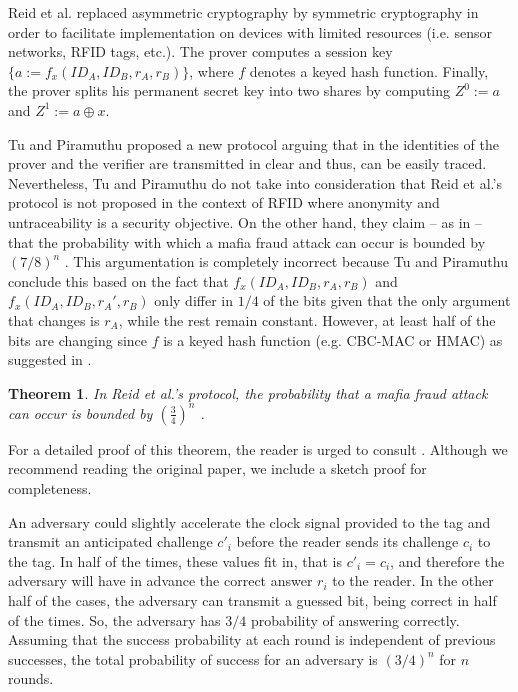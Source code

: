 \documentclass{article}
\newtheorem{theorem}{Theorem}\newtheorem{proposition}[theorem]{Proposition}
\newenvironment{proof}[1][Proof]{\begin{trivlist}
\item[\hskip \labelsep {\bfseries #1}]}{\end{trivlist}}
\begin{document}
Reid et al. \cite{reid2007} replaced asymmetric cryptography by symmetric cryptography in order to facilitate implementation on devices with limited resources (i.e. sensor networks, RFID tags, etc.). The prover computes a session key $\{a := f_x(ID_A, ID_B, r_A, r_B)\}$, where $f$ denotes a keyed hash function. Finally, the prover splits his permanent secret key into two shares by computing $Z^{0} := a$ and $Z^1 := a \oplus x$.

Tu and Piramuthu \cite{TuP-2007-rfidtechnology} proposed a new protocol arguing that in \cite{reid2007} the identities of the prover and the verifier are transmitted in clear and thus, can be easily traced.  Nevertheless, Tu and Piramuthu do not take into consideration that Reid et al.'s protocol is not proposed in the context of RFID where anonymity and untraceability is a security objective.  On the other hand, they claim -- as in  \cite{KimAKSP-2008-icisc} -- that the probability with which a mafia fraud attack can occur is bounded by $(7/8)^n$ \cite{piramuthu07}. This argumentation is completely incorrect because Tu and Piramuthu conclude this based on the fact that $f_x(ID_A, ID_B, r_A, r_B)$ and $f_x(ID_A, ID_B, r_A', r_B)$ only differ in $1/4$ of the bits given that the only argument that changes is $r_A$, while the rest remain constant. However,  at least half of the bits are changing since $f$ is a keyed hash function (e.g. CBC-MAC or HMAC) as suggested in \cite{reid2007}.
\begin{theorem}\label{th::Reid}
In Reid et al.'s protocol, the probability that a mafia fraud attack can occur is bounded by $(\frac{3}{4})^n$ \cite{Mitro1kotsaDPH10}.
\end{theorem}

For a detailed proof of this theorem, the reader is urged to consult \cite{Mitro1kotsaDPH10}. Although we recommend reading the original paper, we include a sketch proof for completeness.

\begin{proof}[Sketch Proof]
An adversary could slightly accelerate the clock signal provided to the tag and transmit an anticipated challenge $c'_i$ before the reader sends its challenge $c_i$ to the tag. In half of the times, these values fit in, that is $c'_i = c_i$, and therefore the adversary will have in advance the correct answer $r_i$ to the reader. In the other half of the cases, the adversary can transmit a guessed bit, being correct in half of the times. So, the adversary has $3/4$ probability of answering correctly.  Assuming that the success probability at each round is independent of previous successes, the total probability of success for an adversary is $(3/4)^n$ for $n$ rounds. \end{proof}
\end{document}
